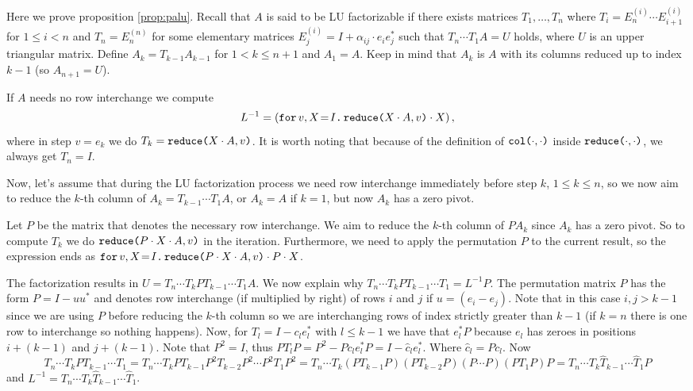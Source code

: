 Here we prove proposition  \ref{prop:palu}. Recall that $A$ is said to be LU factorizable if there exists matrices $T_1,\ldots, T_{n}$ where $T_i=E_{n}^{(i)}\cdots E_{i+1}^{(i)}$ for $1\leq i < n$ and $T_n=E^{(n)}_n$ for some elementary matrices $E_{j}^{(i)}=I+\alpha_{ij}\cdot e_{i}e_{j}^{*}$ such that $T_{n}\cdots T_1A=U$ holds, where $U$ is an upper triangular matrix. Define $A_k=T_{k-1}A_{k-1}$ for $1< k\leq n+1$ and $A_1=A$. Keep in mind that $A_k$ is $A$ with its columns reduced up to index $k-1$ (so $A_{n+1}=U$). 

If $A$ needs no row interchange we compute $$L^{-1}=\left( \initf{I}{v}{X}{\red{X\cdot A}{v}\cdot X} \right),$$ where in step $v=e_k$ we do $T_k=\red{X\cdot A}{v}$. It is worth noting that because of the definition of $\ccol{\cdot}{\cdot}$ inside $\red{\cdot}{\cdot}$, we always get $T_n=I$.


Now, let's assume that during the LU factorization process we need row interchange immediately before step $k$, $1\leq k\leq n$, so we now aim to reduce the $k$-th column of $A_k=T_{k-1}\cdots T_1A$, or $A_k=A$ if $k=1$, but now $A_k$ has a zero pivot. 

Let $P$ be the matrix that denotes the necessary row interchange. We aim to reduce the $k$-th column of $PA_{k}$ since $A_{k}$ has a zero pivot. So to compute $T_k$ we do $\red{P\cdot X\cdot A}{v}$ in the iteration. Furthermore, we need to apply the permutation $P$ to the current result, so the expression ends as $\initf{I}{v}{X}{\red{P\cdot X\cdot A}{v}\cdot P\cdot X}$.

The factorization results in $U=T_{n}\cdots T_kPT_{k-1}\cdots T_1A$. We now explain why $T_{n}\cdots T_kPT_{k-1}\cdots T_1 = L^{-1}P.$ The permutation matrix $P$ has the form $P = I - uu^*$ and denotes row interchange (if multiplied by right) of rows $i$ and $j$ if $u=(e_{i}-e_{j})$. Note that in this case $i,j>k-1$ since we are using $P$ before reducing the $k$-th column so we are interchanging rows of index strictly greater than $k-1$ (if $k=n$ there is one row to interchange so nothing happens). Now, for $T_{l}=I-c_le_l^*$ with $l\leq k-1$ we have that $e_l^*P$ because $e_l$ has zeroes in positions $i+(k-1)$ and $j+(k-1)$. Note that $P^2=I$, thus $PT_lP=P^2-Pc_le_l^*P=I-\widehat{c}_le_l^*.$ Where $\widehat{c}_l=Pc_l$. Now $$T_{n}\cdots T_kPT_{k-1}\cdots T_1=T_{n}\cdots T_kPT_{k-1}P^2T_{k-2}P^2\cdots P^2 T_1P^2=T_{n}\cdots T_k(PT_{k-1}P)(PT_{k-2}P)(P\cdots P)(PT_1P)P=T_{n}\cdots T_k\widehat{T}_{k-1}\cdots \widehat{T}_1P$$ and $L^{-1} = T_{n}\cdots T_k\widehat{T}_{k-1}\cdots \widehat{T}_1$.

